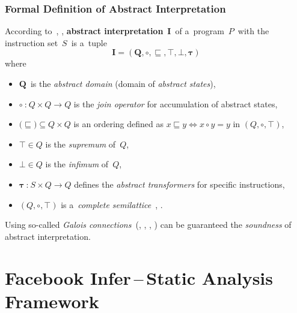 \subsubsection{Formal Definition of Abstract Interpretation}

\begin{definition}
    According to~\cite{AILatticeModelCousot}, \cite{favAI},
    \textbf{abstract interpretation}~$ \boldsymbol{I} $~of a~program~$ P $~with
    the instruction set~$ S $~is a~tuple
    $$ \boldsymbol{I = (Q, \circ, \sqsubseteq, \top, \bot, \tau)} $$
    where
    \begin{itemize}
        \item
            $ \boldsymbol{Q} $~is the \emph{abstract domain} (domain of
            \emph{abstract states}),

        \item
            $ \boldsymbol{\circ}~\text{:}~Q \times Q \rightarrow Q $
            is the \emph{join operator} for accumulation of abstract states,

        \item
            $ \text{(}\boldsymbol{\sqsubseteq}\text{)} \subseteq Q \times Q $ is
            an ordering defined as
            $ x \sqsubseteq y \Leftrightarrow x \circ y = y $ in
            $ (Q, \circ, \top) $,

        \item
            $ \boldsymbol{\top} \in Q $ is the \emph{supremum} of~$ Q $,

        \item
            $ \boldsymbol{\bot} \in Q $ is the \emph{infimum} of~$ Q $,

        \item
            $ \boldsymbol{\tau}~\text{:}~S \times Q \rightarrow Q $
            defines the \emph{abstract transformers} for specific instructions,

        \item
            $ (Q, \circ, \top) $ is a~\emph{complete
            semilattice}~\cite{favLatticesAndFixpoints}, \cite{favAI}.
    \end{itemize}
\end{definition}

Using so-called \emph{Galois connections}~(\cite{programAnalysisNielson},
\cite{wideningNarrowingCousot}, \cite{favAI}, \cite{AICousotWeb}) can be
guaranteed the \emph{soundness} of abstract interpretation.


\section{\texorpdfstring{Facebook Infer\,--\,Static Analysis Framework}{}}
\label{sec:fbinfer}

